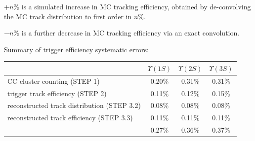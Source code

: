 \documentclass[landscape]{article}
\begin{document}
\vfill

$+n$\% is a simulated increase in MC tracking efficiency, obtained by
de-convolving the MC track distribution to first order in $n$\%.

\vfill

$-n$\% is a further decrease in MC tracking efficiency via an exact
convolution.

\pagebreak

Summary of trigger efficiency systematic errors:

\begin{center}
  \renewcommand{\arraystretch}{1.25}
  \begin{tabular}{p{13 cm} c c c}
    & \mbox{\hspace{0.5 cm}} $\Upsilon(1S)$ \mbox{\hspace{0.5 cm}} & \mbox{\hspace{0.5 cm}} $\Upsilon(2S)$ \mbox{\hspace{0.5 cm}} & \mbox{\hspace{0.5 cm}} $\Upsilon(3S)$ \mbox{\hspace{0.5 cm}} \\\hline
    CC cluster counting (STEP 1) & 0.20\% & 0.31\% & 0.31\% \\
    trigger track efficiency (STEP 2) & 0.11\% & 0.12\% & 0.15\% \\
    reconstructed track distribution (STEP 3.2) & 0.08\% & 0.08\% & 0.08\% \\
    reconstructed track efficiency (STEP 3.3) & 0.11\% & 0.11\% & 0.11\% \\\hline\hline
    & 0.27\% & 0.36\% & 0.37\% \\
  \end{tabular}
\end{center}

\vfill
\end{document}
